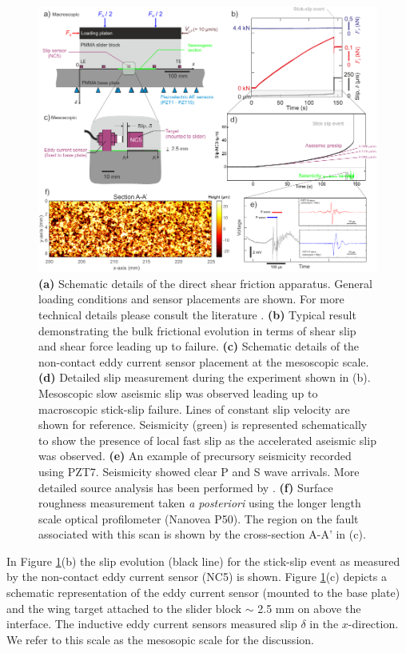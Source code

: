 \documentclass[preprint,1p, 10pt,authoryear]{elsarticle}
\begin{document}
\begin{figure}
 	\centering
 	\includegraphics{FIG1_revised.pdf} 
 	\caption{ \textbf{(a)} Schematic details of the direct shear friction apparatus. General loading conditions and sensor placements are shown. For more technical details please consult the literature \citep{Selvadurai2015, Selvadurai2015a}. \textbf{(b)} Typical result demonstrating the bulk frictional evolution in terms of shear slip and shear force leading up to failure. \textbf{(c)} Schematic details of the non-contact eddy current sensor placement at the mesoscopic scale. \textbf{(d)} Detailed slip measurement during the experiment shown in (b).  Mesoscopic slow aseismic slip was observed leading up to macroscopic stick-slip failure.  Lines of constant slip velocity are shown for reference.  Seismicity (green) is represented schematically to show the presence of local fast slip as the accelerated aseismic slip was observed. \textbf{(e)}  An example of precursory seismicity recorded using PZT7.  Seismicity showed clear P and S wave arrivals. More detailed source analysis has been performed by \citet{Selvadurai2019}. \textbf{(f)} Surface roughness measurement taken \textit{a posteriori} using the longer length scale optical profilometer (Nanovea P50).  The region on the fault associated with this scan is shown by the cross-section A-A’ in (c).}
 	\label{fig1}
 \end{figure}
 In Figure \ref{fig1}(b) the slip evolution (black line) for the stick-slip event as measured by the non-contact eddy current sensor (NC5) is shown.  Figure \ref{fig1}(c) depicts a schematic representation of the eddy current sensor (mounted to the base plate) and the wing target attached to the slider block $\sim$ 2.5 mm on above the interface.  The inductive eddy current sensors measured slip $\delta$ in the $x$-direction. We refer to this scale as the mesosopic scale for the discussion.   
 
\end{document}
